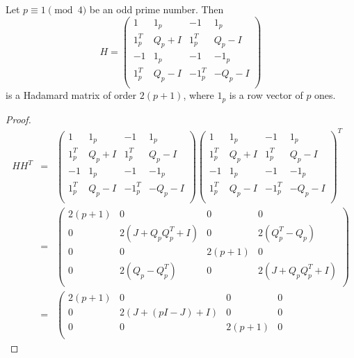 \begin{theorem} \label{thm:paley-1}
 Let $p \equiv 1 \pmod 4$ be an odd prime number. Then
  $$H = \left(\begin{array}{cc|cc}
     1 & 1_{p}     & -1 & 1_{p}\\
     1_{p}^T & Q_p+I & 1_{p}^T & Q_p-I \\
     \hline
     -1 & 1_{p}     & -1 & -1_{p}\\
     1_{p}^T & Q_p-I & -1_{p}^T & -Q_p-I \\
    \end{array}\right)$$
  is a Hadamard matrix of order $2(p+1)$, where $1_p$ is a row vector of $p$ ones.

  \begin{proof}
  \equationarray
  $$\begin{array}{rcll}
     HH^T &=& \left(\begin{array}{cc|cc}
     1 & 1_{p}     & -1 & 1_{p}\\
     1_{p}^T & Q_p+I & 1_{p}^T & Q_p-I \\
     \hline
     -1 & 1_{p}     & -1 & -1_{p}\\
     1_{p}^T & Q_p-I & -1_{p}^T & -Q_p-I \\
    \end{array}\right)
    \left(\begin{array}{cc|cc}
     1 & 1_{p}     & -1 & 1_{p}\\
     1_{p}^T & Q_p+I & 1_{p}^T & Q_p-I \\
     \hline
     -1 & 1_{p}     & -1 & -1_{p}\\
     1_{p}^T & Q_p-I & -1_{p}^T & -Q_p-I \\
    \end{array}\right)^T \\
   & = &
    \left(\begin{array}{cccc}
     2(p+1) & 0 & 0 & 0\\
     0 & 2(J + Q_pQ_p^T + I) & 0 & 2(Q_p^T-Q_p) \\
     0 & 0 & 2(p+1) & 0 \\
     0 & 2(Q_p-Q_p^T) & 0 & 2(J + Q_pQ_p^T + I) \\
    \end{array}\right) \\
   & = &
    \left(\begin{array}{cccc}
     2(p+1) & 0 & 0 & 0\\
     0 & 2(J + (pI-J) + I) & 0 & 0 \\
     0 & 0 & 2(p+1) & 0 \\

\end{array}
\end{array}$$
\end{proof}
\end{theorem}
